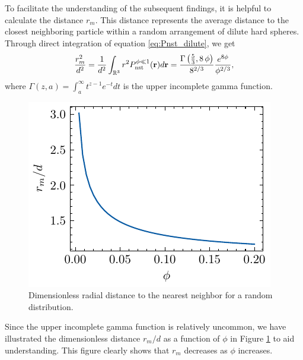 To facilitate the understanding of the subsequent findings, it is helpful to calculate the distance $r_m$. 
This distance represents the average distance to the closest neighboring particle within a random arrangement of dilute hard spheres. 
Through direct integration of equation \ref{eq:Pnst_dilute}, we get
\begin{align}
    \frac{r_m^2}{d^2}
    = 
    \frac{1}{d^2}
    \int_{\mathbb{R}^3} r^2 P_\text{nst}^{\phi \ll 1}(\textbf{r}) d\textbf{r} 
    =  \frac{\Gamma\left({{5}\over{3}} , 8\,\phi\right)}{8^{2/3}}\frac{e^{8\phi}}{\phi^{2/3}},
\end{align}
where $\Gamma(z,a) = \int_a^\infty t^{z-1} e^{-t} dt$ is the upper incomplete gamma function.
\begin{figure}
  \centering
  \includegraphics[height = 0.3\textwidth]{image/HOMOGENEOUS_NEW/PA/rm.pdf}
  \caption{Dimensionless radial distance to the nearest neighbor for a random distribution.}
  \label{fig:agee}
\end{figure}
Since the upper incomplete gamma function is relatively uncommon, we have illustrated the dimensionless distance $r_m/d$ as a function of $\phi$ in Figure \ref{fig:agee} to aid understanding. This figure clearly shows that $r_m$ decreases as $\phi$ increases.


